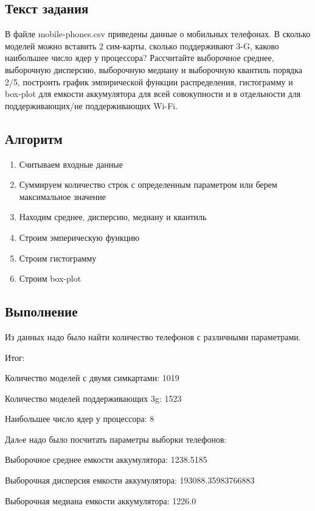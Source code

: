\documentclass{article}
\begin{document}
\subsection{Текст задания} 

В файле mobile-phones.csv приведены данные о мобильных телефонах.
В сколько моделей можно вставить 2 сим-карты, сколько поддерживают 3-G, каково наибольшее число ядер у процессора?
Рассчитайте выборочное среднее, выборочную дисперсию, выборочную медиану и выборочную квантиль порядка 2/5, построить график эмпирической функции распределения,
гистограмму и box-plot для емкости аккумулятора для всей совокупности и в отдельности для поддерживающих/не поддерживающих Wi-Fi.


\subsection{Алгоритм}\label{subsec:2.-1}

\begin{enumerate}
\item Считываем входные данные
\item Суммируем количество строк с определенным параметром или берем максимальное значение
\item Находим среднее, дисперсию, медиану и квантиль
\item Строим эмперическую функцию
\item Строим гистограмму
\item Строим box-plot
\end{enumerate}

\subsection{Выполнение}\label{subsec:2.-2}
Из данных надо было найти количество телефонов с различными параметрами.

Итог:

Количество моделей с двумя симкартами: 1019

Количество моделей поддерживающих 3g: 1523

Наибольшее число ядер у процессора: 8

Далeе надо было посчитать параметры выборки телефонов:

Выборочное среднее емкости аккумулятора: 1238.5185

Выборочная дисперсия емкости аккумулятора: 193088.35983766883

Выборочная медиана емкости аккумулятора: 1226.0
\end{document}
